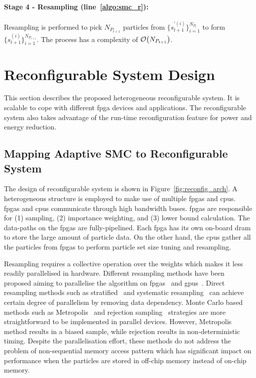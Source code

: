 \paragraph{Stage 4 - Resampling (line~\ref{algo:smc_r}): }

Resampling is performed to pick ${N_{P_{t+1}}}$ particles from $\{s_{t+1}^{\prime(i)}\}^{N_{P_t}}_{i=1}$ to form $\{s_{t+1}^{(i)}\}^{N_{P_{t+1}}}_{i=1}$.
The process has a complexity of $\mathop{}\mathopen{}\mathcal{O}\mathopen{}\left(N_{P_{t+1}}\right)$.

\section{Reconfigurable System Design}
\label{sec:reconfig_hrs}

This section describes the proposed heterogeneous reconfigurable system.
It is scalable to cope with different \gls{fpga} devices and applications.
The reconfigurable system also takes advantage of the run-time reconfiguration feature for power and energy reduction.

\subsection{Mapping Adaptive SMC to Reconfigurable System}
\label{sec:reconfig_arch}

The design of reconfigurable system is shown in Figure~\ref{fig:reconfig_arch}.
A heterogeneous structure is employed to make use of multiple \glspl{fpga} and \glspl{cpu}.
\glspl{fpga} and \glspl{cpu} communicate through high bandwidth buses.
\glspl{fpga} are responsible for (1) sampling, (2) importance weighting, and (3) lower bound calculation.
The data-paths on the \glspl{fpga} are fully-pipelined.
Each \gls{fpga} has its own on-board \gls{dram} to store the large amount of particle data.
On the other hand, the \glspl{cpu} gather all the particles from \glspl{fpga} to perform particle set size tuning and resampling.

Resampling requires a collective operation over the weights which makes it less readily parallelised in hardware.
Different resampling methods have been proposed aiming to parallelise the algorithm on \glspl{fpga}~\cite{bolic05} and \glspl{gpu}~\cite{murray14}.
Direct resampling methods such as stratified~\cite{sarndal03} and systematic resampling~\cite{douc05} can achieve certain degree of parallelism by removing data dependency.
Monte Carlo based methods such as Metropolis~\cite{metropolis53} and rejection sampling~\cite{neal03} strategies are more straightforward to be implemented in parallel devices.
However, Metropolis method results in a biased sample, while rejection results in non-deterministic timing.
Despite the parallelisation effort, these methods do not address the problem of non-sequential memory access pattern which has significant impact on performance when the particles are stored in off-chip memory instead of on-chip memory.


